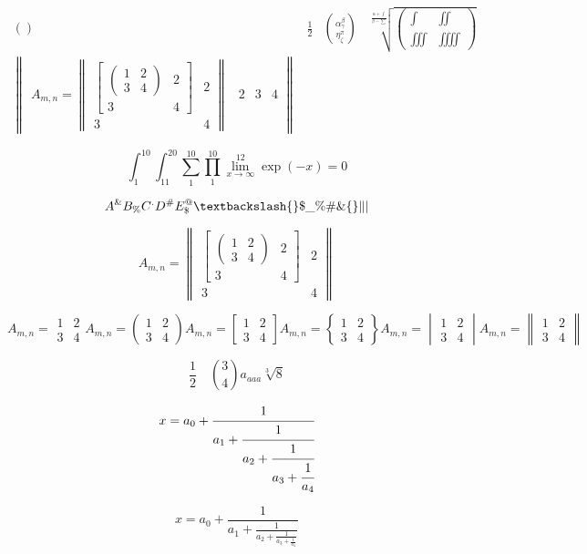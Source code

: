 \documentclass[a4paper,12pt]{article}
\begin{document}
$$
\begin{matrix} \left( \right) & \frac12 & \binom{\alpha^\beta_\gamma}{\eta_\zeta^\pi} & \sqrt[\frac{\alpha + \int}{\beta - \sum}]{\begin{pmatrix} \int & \iint \\ \iiint & \iiiint \end{pmatrix}} \\
\begin{Vmatrix} A_{m,n} = \begin{Vmatrix} \begin{bmatrix} \begin{pmatrix} 1 & 2 \\ 3 & 4 \end{pmatrix} & 2 \\ 3 & 4 \end{bmatrix} & 2 \\ 3 & 4 \end{Vmatrix} & 2 & 3 & 4 \end{Vmatrix} & & &
\end{matrix}
$$

$$ 
\int^{10}_1 \int_{11}^{20} \sum^{10}_{1} \prod_{1}^{10} \lim_{x \to \infty}^{12} \exp(-x) = 0
$$

$$
A^\& B_\% C^. D^\# E_\$^@ \textbackslash \lbrace \rbrace \$ \_ \% \# \& \{ \}  \| |
$$

$$
A_{m,n} = \begin{Vmatrix} \begin{bmatrix} \begin{pmatrix} 1 & 2 \\ 3 & 4 \end{pmatrix} & 2 \\ 3 & 4 \end{bmatrix} & 2 \\ 3 & 4 \end{Vmatrix}
$$

$$
A_{m,n} = \begin{matrix} 1 & 2 \\ 3 & 4 \end{matrix}
A_{m,n} = \begin{pmatrix} 1 & 2 \\ 3 & 4 \end{pmatrix}
A_{m,n} = \begin{bmatrix} 1 & 2 \\ 3 & 4 \end{bmatrix}
A_{m,n} = \begin{Bmatrix} 1 & 2 \\ 3 & 4 \end{Bmatrix}
A_{m,n} = \begin{vmatrix} 1 & 2 \\ 3 & 4 \end{vmatrix}
A_{m,n} = \begin{Vmatrix} 1 & 2 \\ 3 & 4 \end{Vmatrix}
$$

$$
\frac12 \quad \binom34 a_{aaa} \sqrt[3]{8}
$$

$$
  x = a_0 + \cfrac{1}{a_1
          + \cfrac{1}{a_2
          + \cfrac{1}{a_3 + \cfrac{1}{a_4} } } }
$$

$$
  x = a_0 + \frac{1}{a_1
          + \frac{1}{a_2
          + \frac{1}{a_3 + \frac{1}{a_4} } } }
$$
\end{document}
